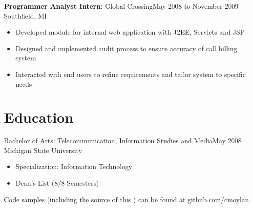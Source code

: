 \documentclass[]{res}
\begin{document}
\begin{resume}
{\bf Programmer Analyst Intern:} Global Crossing\dotfill May 2008 to November 2009\\
Southfield, MI
\begin{itemize}
\item Developed module for internal web application with J2EE, Servlets and JSP
\item Designed and implemented audit process to ensure accuracy of call billing system
\item Interacted with end users to refine requirements and tailor system to specific needs
\end{itemize}



\section{Education}
Bachelor of Arts: Telecommunication, Information Studies and Media\dotfill May 2008\\
Michigan State University
\begin{itemize}
\item Specialization: Information Technology
\item Dean's List (8/8 Semesters)
\end{itemize}





 \hoffset\centerline{\footnotesize Code samples (including the source of this \Resume) can be found at github.com/cmoylan}

\end{resume}
\end{document}
